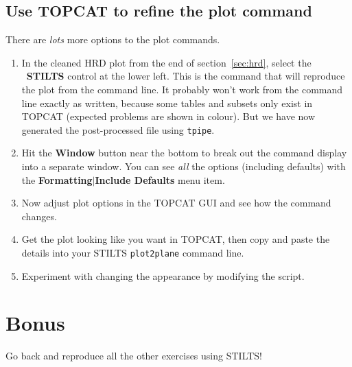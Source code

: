 \documentclass{article}
\newcommand{\buttimg}[1]
           {\mbox{\vtop{\vskip-2ex\hbox{\texttt{[image: \#1]}}}}}
\newcommand{\winfig}[2]
           {\vspace*{-0.5cm}
            \hspace*{0.5cm}\mbox{\vtop{\hbox{\texttt{[image: \#2]}}}}}
\newcommand{\lab}[1]{{\bf #1}}
\newcommand{\ma}[2]{\buttimg{#1}~\lab{#2}}
\begin{document}
\begin{minipage}[t]{11cm}
  \vspace*{2cm}
  \subsection{Use TOPCAT to refine the plot command}
  There are {\em lots\/} more options to the plot commands.

  \begin{enumerate}
  \item In the cleaned HRD plot from the end of section~\ref{sec:hrd},
        select the \ma{stilts.png}{STILTS} control at the lower left.
        This is the command that will reproduce the plot from the command line.
        It probably won't work from the command line exactly as written,
        because some tables and subsets only exist in TOPCAT
        (expected problems are shown in colour).
        But we have now generated the post-processed file using {\tt tpipe}.
  \item Hit the \lab{Window} button near the bottom to break out
        the command display into a separate window.
        You can see {\em all\/} the options (including defaults) with the
        \lab{Formatting}$\mid$\lab{Include Defaults} menu item.
  \item Now adjust plot options in the TOPCAT GUI and see how the command
        changes.
  \item Get the plot looking like you want in TOPCAT, then copy and paste
        the details into your STILTS {\tt plot2plane} command line.
  \item Experiment with changing the appearance by modifying the script.
  \end{enumerate}
\end{minipage}
\begin{minipage}[t]{8cm}
  \winfig{width=8cm}{hrd_stilts.png}
\end{minipage}


\newpage


\section*{Bonus}

Go back and reproduce all the other exercises using STILTS!
\end{document}
